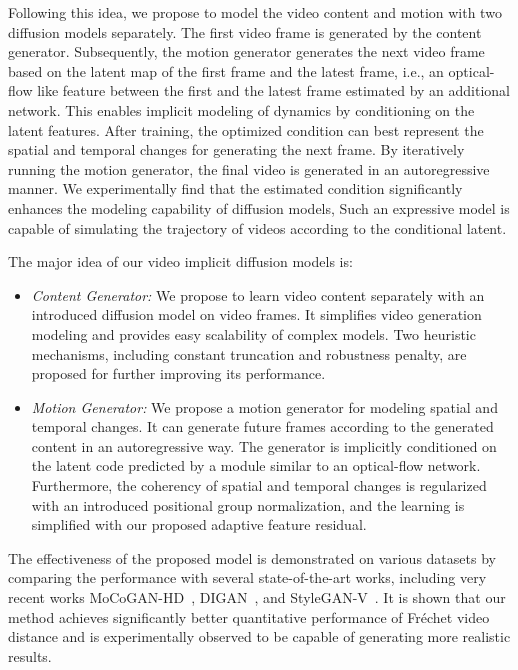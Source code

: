 \documentclass[letterpaper]{article}
\begin{document}
Following this idea, we propose to model the video content and motion with two diffusion models separately.
The first video frame is generated by the content generator. Subsequently, the motion generator generates the next video frame based on the latent map of the first frame and the latest frame, i.e., an optical-flow like feature between the first and the latest frame estimated by an additional network.
This enables implicit modeling of dynamics by conditioning on the latent features.
After training, the optimized condition can best represent the spatial and temporal changes for generating the next frame.
By iteratively running the motion generator, the final video is generated in an autoregressive manner.
We experimentally find that the estimated condition significantly enhances the modeling capability of diffusion models,
Such an expressive model is capable of simulating the trajectory of videos according to the conditional latent.

The major idea of  our video implicit diffusion models is: 
\begin{itemize}
  \item \emph{Content Generator:} We propose to learn video content separately with an introduced diffusion model on video frames. It simplifies video generation modeling and provides easy scalability of complex models.
  Two heuristic mechanisms, including constant truncation and robustness penalty, are proposed for further improving its performance.  
\item \emph{Motion Generator:} We propose a motion generator for modeling spatial and temporal changes. It can generate future frames according to the generated content in an autoregressive way.
  The generator is implicitly conditioned on the latent code predicted by a module similar to an optical-flow network.
  Furthermore, the coherency of spatial and temporal changes is regularized with an introduced positional group normalization, and the learning is simplified with our proposed adaptive feature residual.
\end{itemize}

The effectiveness of the proposed model is demonstrated on various datasets by comparing the performance with several state-of-the-art works, including very recent works MoCoGAN-HD~\cite{tian2021good}, DIGAN~\cite{yu2022generating}, and StyleGAN-V~\cite{skorokhodov2021stylegan}.  It is shown that our method achieves significantly better quantitative performance of Fr\'echet video distance and is experimentally observed to be capable of generating more realistic results.
\end{document}
